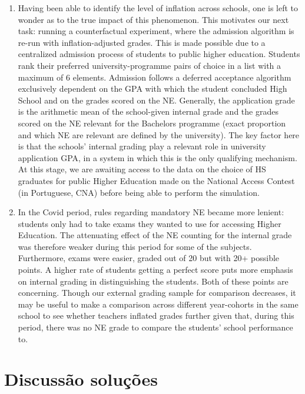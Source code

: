 \documentclass{article}
\begin{document}
\begin{enumerate}
    \item Having been able to identify the level of inflation across schools, one is left to wonder as to the true impact of this phenomenon. This motivates our next task: running a counterfactual experiment, where the admission algorithm is re-run with inflation-adjusted grades. This is made possible due to a centralized admission process of students to public higher education. Students rank their preferred university-programme pairs of choice in a list with a maximum of 6 elements. Admission follows a deferred acceptance algorithm exclusively dependent on the GPA with which the student concluded High School and on the grades scored on the NE. Generally, the application grade is the arithmetic mean of the school-given internal grade and the grades scored on the NE relevant for the Bachelors programme (exact proportion and which NE are relevant are defined by the university). The key factor here is that the schools' internal grading play a relevant role in university application GPA, in a system in which this is the only qualifying mechanism.
    At this stage, we are awaiting access to the data on the choice of HS graduates for public Higher Education made on the National Access Contest (in Portuguese, CNA) before being able to perform the simulation.

    \item In the Covid period, rules regarding mandatory NE became more lenient: students only had to take exams they wanted to use for accessing Higher Education. The attenuating effect of the NE counting for the internal grade was therefore weaker during this period for some of the subjects. Furthermore, exams were easier, graded out of 20 but with 20+ possible points. A higher rate of students getting a perfect score puts more emphasis on internal grading in distinguishing the students. Both of these points are concerning. Though our external grading sample for comparison decreases, it may be useful to make a comparison across different year-cohorts in the same school to see whether teachers inflated grades further given that, during this period, there was no NE grade to compare the students' school performance to.

\end{enumerate}




\section{Discussão soluções}
\end{document}
